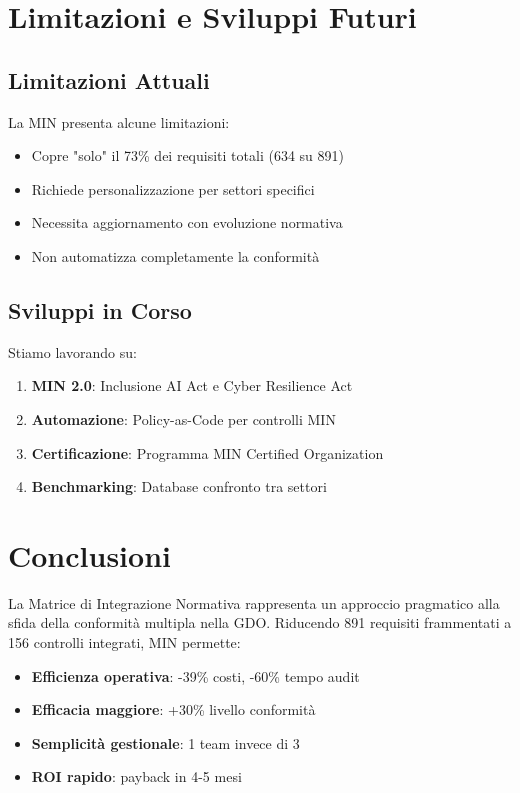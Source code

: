 \section{Limitazioni e Sviluppi Futuri}

\subsection{Limitazioni Attuali}

La MIN presenta alcune limitazioni:
\begin{itemize}
\item Copre "solo" il 73\% dei requisiti totali (634 su 891)
\item Richiede personalizzazione per settori specifici
\item Necessita aggiornamento con evoluzione normativa
\item Non automatizza completamente la conformità
\end{itemize}

\subsection{Sviluppi in Corso}

Stiamo lavorando su:
\begin{enumerate}
\item \textbf{MIN 2.0}: Inclusione AI Act e Cyber Resilience Act
\item \textbf{Automazione}: Policy-as-Code per controlli MIN
\item \textbf{Certificazione}: Programma MIN Certified Organization
\item \textbf{Benchmarking}: Database confronto tra settori
\end{enumerate}

\section{Conclusioni}

La Matrice di Integrazione Normativa rappresenta un approccio pragmatico alla sfida della conformità multipla nella GDO. Riducendo 891 requisiti frammentati a 156 controlli integrati, MIN permette:

\begin{itemize}
\item \textbf{Efficienza operativa}: -39\% costi, -60\% tempo audit
\item \textbf{Efficacia maggiore}: +30\% livello conformità
\item \textbf{Semplicità gestionale}: 1 team invece di 3
\item \textbf{ROI rapido}: payback in 4-5 mesi
\end{itemize}

